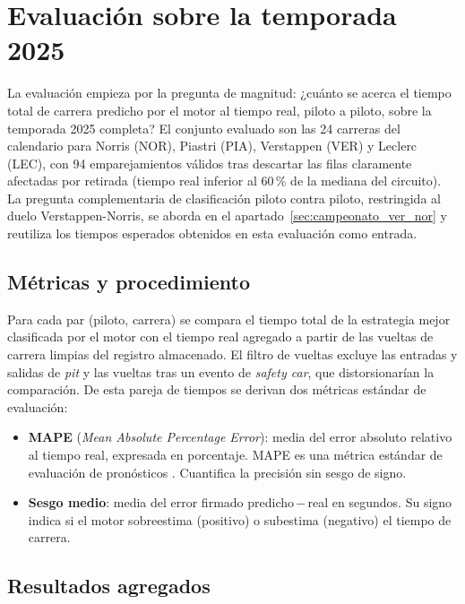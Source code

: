 \section{Evaluación sobre la temporada 2025}
\label{sec:eval_calibracion}

La evaluación empieza por la pregunta de magnitud: ¿cuánto se acerca el tiempo total de carrera predicho por el motor al tiempo real, piloto a piloto, sobre la temporada 2025 completa? El conjunto evaluado son las 24 carreras del calendario para Norris (NOR), Piastri (PIA), Verstappen (VER) y Leclerc (LEC), con 94 emparejamientos válidos tras descartar las filas claramente afectadas por retirada (tiempo real inferior al 60\,\% de la mediana del circuito). La pregunta complementaria de clasificación piloto contra piloto, restringida al duelo Verstappen-Norris, se aborda en el apartado~\ref{sec:campeonato_ver_nor} y reutiliza los tiempos esperados obtenidos en esta evaluación como entrada.

\subsection{Métricas y procedimiento}
\label{ssec:eval_calibracion_metodo}

Para cada par (piloto, carrera) se compara el tiempo total de la estrategia mejor clasificada por el motor con el tiempo real agregado a partir de las vueltas de carrera limpias del registro almacenado. El filtro de vueltas excluye las entradas y salidas de \textit{pit} y las vueltas tras un evento de \textit{safety car}, que distorsionarían la comparación. De esta pareja de tiempos se derivan dos métricas estándar de evaluación:

\begin{itemize}
    \item \textbf{MAPE} (\textit{Mean Absolute Percentage Error}): media del error absoluto relativo al tiempo real, expresada en porcentaje. MAPE es una métrica estándar de evaluación de pronósticos \cite{hyndman2006accuracy}. Cuantifica la precisión sin sesgo de signo.
    \item \textbf{Sesgo medio}: media del error firmado predicho\,$-$\,real en segundos. Su signo indica si el motor sobreestima (positivo) o subestima (negativo) el tiempo de carrera.
\end{itemize}

\subsection{Resultados agregados}
\label{ssec:eval_calibracion_resultados}

